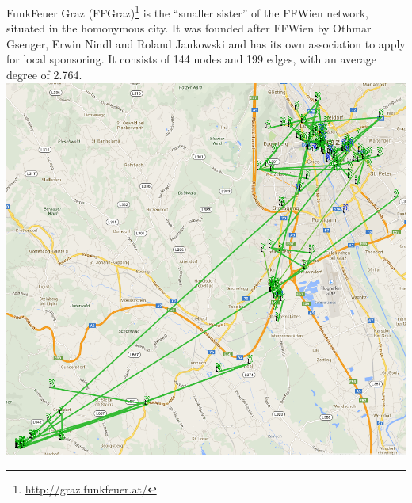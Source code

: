 \documentclass[oneside,openany]{memoir}
\begin{document}
FunkFeuer Graz (FFGraz)\footnote{\url{http://graz.funkfeuer.at/}} is the
``smaller sister'' of the FFWien network, situated in the homonymous
city. It was founded after FFWien by Othmar Gsenger, Erwin Nindl and
Roland Jankowski and has its own association to apply for local
sponsoring. It consists of 144 nodes and 199 edges, with an average
degree of 2.764. \includegraphics{images/graz_map.png}
\end{document}
